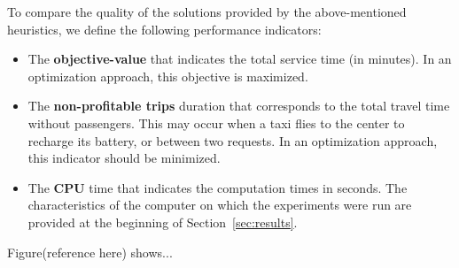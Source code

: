 To compare the quality of the solutions provided by the above-mentioned heuristics, we define the following performance indicators:
\begin{itemize}
	\item The \textbf{objective-value} that indicates the total service time (in minutes). In an optimization approach, this objective is maximized.
	
	\item The \textbf{non-profitable trips} duration that corresponds to the total travel time without passengers. This may occur when a taxi flies to the center to recharge its battery, or between two requests. In an optimization approach, this indicator should be minimized. 

	\item The \textbf{CPU} time that indicates the computation times in seconds. The characteristics of the computer on which the experiments were run are provided at the beginning of Section~\ref{sec:results}.
\end{itemize}

Figure(reference here) shows...













